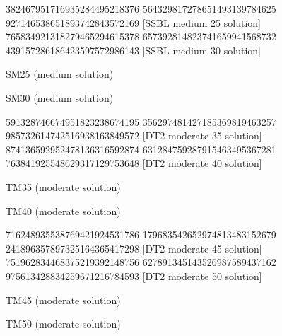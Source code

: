 \documentclass[twoside]{article}
\begin{document}
\renewcommand*{\puzzlefile}{sm25.ans}
\writepuzzle%
{382467951}{716935284}{495218376}%
{564329817}{278651493}{139784625}%
{927146538}{651893742}{843572169}%
[SSBL medium 25 solution]
\renewcommand*{\puzzlefile}{sm30.ans}
\writepuzzle%
{765834921}{318279465}{294615378}%
{657392814}{823741659}{941568732}%
{439157286}{186423597}{572986143}%
[SSBL medium 30 solution]
\vfill
\noindent\begin{minipage}{0.47\linewidth}\begin{center}
SM25 (medium solution) \\
\end{center}\end{minipage}
\hfill
\begin{minipage}{0.47\linewidth}\begin{center}
SM30 (medium solution) \\
\end{center}\end{minipage}

\renewcommand*{\puzzlefile}{tm35.ans}
\writepuzzle%
{591328746}{674951823}{238674195}%
{356297481}{427185369}{819463257}%
{985732614}{742516938}{163849572}%
[DT2 moderate 35 solution]
\renewcommand*{\puzzlefile}{tm40.ans}
\writepuzzle%
{874136592}{952478136}{316592874}%
{631284759}{287915463}{495367281}%
{763841925}{548629317}{129753648}%
[DT2 moderate 40 solution]
\vfill
\noindent\begin{minipage}{0.47\linewidth}\begin{center}
TM35 (moderate solution) \\
\end{center}\end{minipage}
\hfill
\begin{minipage}{0.47\linewidth}\begin{center}
TM40 (moderate solution) \\
\end{center}\end{minipage}

\renewcommand*{\puzzlefile}{tm45.ans}
\writepuzzle%
{716248935}{538769421}{924531786}%
{179683542}{652974813}{483152679}%
{241896357}{897325164}{365417298}%
[DT2 moderate 45 solution]
\renewcommand*{\puzzlefile}{tm50.ans}
\writepuzzle%
{751962834}{468375219}{392148756}%
{627891345}{143526987}{589437162}%
{975613428}{834259671}{216784593}%
[DT2 moderate 50 solution]
\vfill
\noindent\begin{minipage}{0.47\linewidth}\begin{center}
TM45 (moderate solution) \\
\end{center}\end{minipage}
\hfill
\begin{minipage}{0.47\linewidth}\begin{center}
TM50 (moderate solution) \\
\end{center}\end{minipage}
\end{document}
